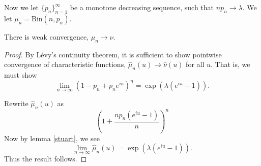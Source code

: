 \documentclass{unswmaths}
\begin{document}
Now we let $\{p_n\}_{n=1}^\infty$ be a monotone decreasing sequence, such
that $np_n \rightarrow \lambda$. We let $\mu_n = \mathrm{Bin}(n,p_n)$.
\begin{theorem}
    There is weak convergence, $\mu_n\rightarrow\nu$.
\end{theorem}
\begin{proof}
    By L\'evy's continuity theorem, it is sufficient to show pointwise convergence
    of characteristic functions, $\hat{\mu}_n(u)\rightarrow \hat{\nu}(u)$
    for all $u$. That is, we must show
    \begin{equation*}
        \lim_{n\rightarrow\infty} (1-p_n+p_ne^{iu})^n = \exp(\lambda(e^{iu}-1)).
    \end{equation*}    
    
    Rewrite $\hat{\mu}_n(u)$ as
    \begin{equation*}
        \left(1+\frac{np_n(e^{iu}-1)}{n}\right)^n
    \end{equation*}
    Now by lemma \ref{stuart}, we see
    \begin{equation*}
        \lim_{n\rightarrow\infty} \hat{\mu}_n(u) = \exp(\lambda(e^{iu}-1)).
    \end{equation*}
    Thus the result follows.
\end{proof}
\end{document}
